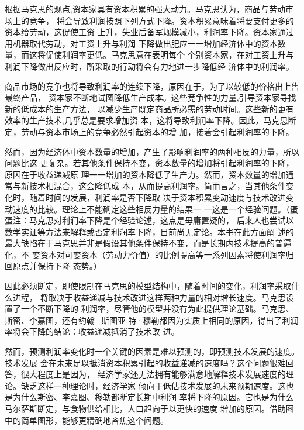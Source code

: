 根据马克思的观点,资本家具有资本积累的强大动力。马克思认为，商品与劳动市场上的竞争，
将会导致利润按照下列方式下降。资本积累意味着将要支付更多的资本给劳动，这促使工资
上升，失业后备军规模减小，利润率下降。资本家通过用机器取代劳动，对工资上升与利润
下降做出肥应一一增加经济体中的资本数量，而这将促使利润率更低。马克思意在表明每个
个别资本家，在对工资上升与利润下降做出反应时，所采取的行动将会有力地进一步降低经
济体中的利润率。

商品市场的竞争也将导致利润率的连续下降，原因在于，为了以较低的价格出上售最终产品，
资本家不断地试图降低生产成本。这些竞争性的力量,引导资本家寻找新的低成本的生产方法，
以减少生产既定商品所必需的劳动时间。这些新的更有效率的生产技术,几乎总是要求增加资
本，这将导致利润率下降。因此，马克思断定，劳动与资本市场上的竞争必然引起资本的增
加，接着会引起利润率的下降。

然而，因为经济体中资本数量的增加，产生了影响利润率的两种相反的力量，所以问题比这
更复杂。若其他条件保持不变，资本数量的增加将引起利润率的下降，原因在于收益递减原
理一一增加的资本降低了生产力。然而，资本数量的增加通常与新技术相混合，这会降低成
本，从而提高利润率。简而言之，当其他条件变化时，随着时间的发展，利润率是否下降取
决于资本积累变动速度与技术改进变动速度的比较。理论上不能确定这些相反力量的结果一
一这是一个经验问题。（蛋蛋注：马克思对利润率下降是个经验论述，这点是毋庸置疑的，
后来人也尝试以数学实证等方法来解释或否定利润率下降，目前尚无定论。本书在此方面阐
述的最大缺陷在于马克思并非是假设其他条件保持不变，而是长期内技术提高的普遍化，不
变资本对可变资本（劳动力价值）的比例提高等一系列因素将使利润率归回原点并保持下降
态势。）

因此必须断定，即使限制在马克思的模型结构中，随着时间的变化，利润率采取什么进程，
将取决于收益递减与技术改进这样两种力量的相对增长速度。马克思设置了一个不断下降的
利润率，尽管他的模型并没有为此提供理论基础。马克思、斯密、李嘉图，还有约翰·斯图亚
特·穆勒都因为实质上相同的原因，得出了利润率将会下降的结论：收益递减抵消了技术改
进。

然而，预测利润率变化时一个关键的因素是难以预测的，即预测技术发展的速度。技术发展
会在未来足以抵消资本积累引起的收益递减的速度吗？这个问题很难回答，很大程度上是因为，
经济学家还无法拥有能够满意地解释技术发展速度的理论。缺乏这样一种理论时，经济学家
倾向于低估技术发展的未来预期速度。这也是为什么斯密、李嘉图、穆勒都断定长期中利润
率将下降的原因。它也是为什么马尔萨斯断定，与食物供给相比，人口趋向于以更快的速度
增加的原因。借助图中的简单图形，能够更精确地吝焦这个问题。

